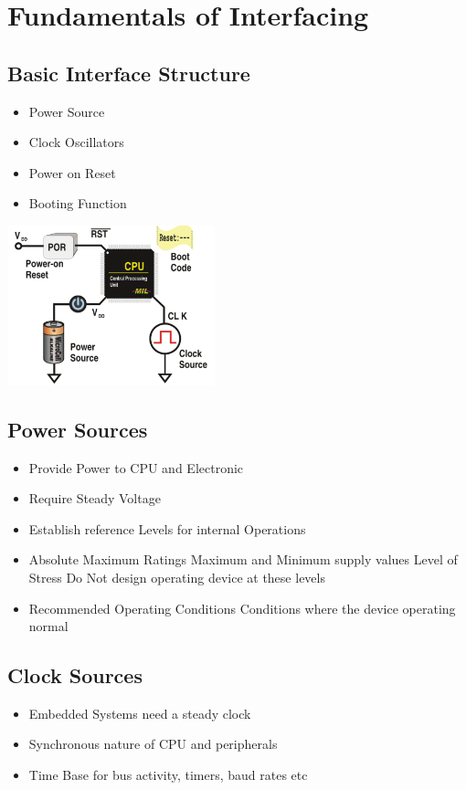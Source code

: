 \section{Fundamentals of Interfacing}
\subsection{Basic Interface Structure}
\begin{minipage}{9cm}
	\begin{itemize}
		\item Power Source
		\item Clock Oscillators
		\item Power on Reset
		\item Booting Function
	\end{itemize}
\end{minipage}
\begin{minipage}{5cm}
	\includegraphics[width=6cm]{images/power.png}
\end{minipage}
\subsection{Power Sources}
\begin{itemize}
	\item Provide Power to CPU and Electronic
	\item Require Steady Voltage
	\item Establish reference Levels for internal Operations
	\item Absolute Maximum Ratings
	\subitem Maximum and Minimum supply values
	\subitem Level of Stress
	\subitem Do Not design operating device at these levels
	\item Recommended Operating Conditions
	\subitem Conditions where the device operating normal	
\end{itemize}
\subsection{Clock Sources}
\begin{itemize}
	\item Embedded Systems need a steady clock
	\item Synchronous nature of CPU and peripherals
	\item Time Base for bus activity, timers, baud rates etc
\end{itemize}
